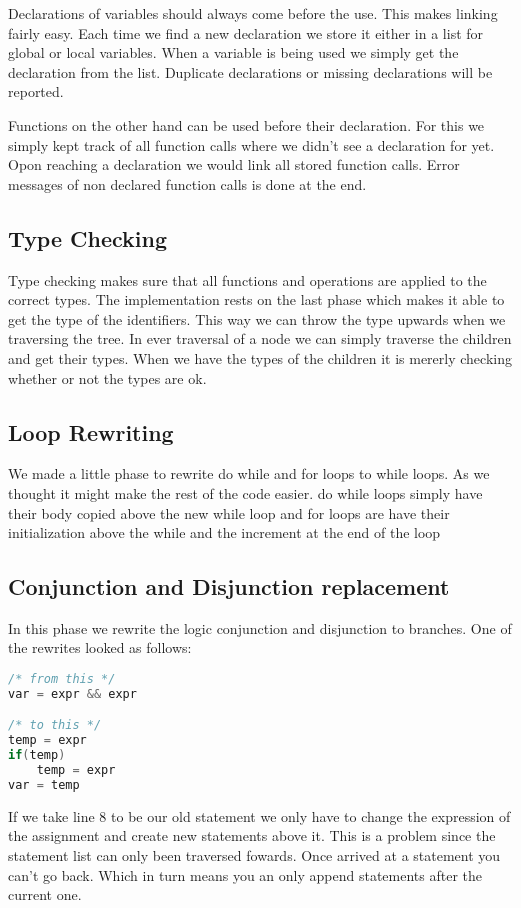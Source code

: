 \documentclass[a4paper]{article}
\begin{document}
Declarations of variables should always come before the use. This makes linking
fairly easy. Each time we find a new declaration we store it either in a list
for global or local variables. When a variable is being used we simply get the
declaration from the list. Duplicate declarations or missing declarations will
be reported.

Functions on the other hand can be used before their declaration. For this we
simply kept track of all function calls where we didn't see a declaration for
yet. Opon reaching a declaration we would link all stored function calls. Error
messages of non declared function calls is done at the end.

\subsection{Type Checking}
Type checking makes sure that all functions and operations are applied to the
correct types. The implementation rests on the last phase which makes it able
to get the type of the identifiers. This way we can throw the type upwards when
we traversing the tree. In ever traversal of a node we can simply traverse the
children and get their types. When we have the types of the children it is
mererly checking whether or not the types are ok.

\subsection{Loop Rewriting}
We made a little phase to rewrite do while and for loops to while loops. As we
thought it might make the rest of the code easier. do while loops simply have
their body copied above the new while loop and for loops are have their
initialization above the while and the increment at the end of the loop


\subsection{Conjunction and Disjunction replacement}
In this phase we rewrite the logic conjunction and disjunction to branches. One
of the rewrites looked as follows:
\begin{lstlisting}[language=C]
/* from this */
var = expr && expr

/* to this */
temp = expr
if(temp)
    temp = expr
var = temp
\end{lstlisting}

If we take line 8 to be our old statement we only have to change the expression
of the assignment and create new statements above it. This is a problem since
the statement list can only been traversed fowards. Once arrived at a statement you can't go
back. Which in turn means you an only append statements after the current one.
\end{document}
